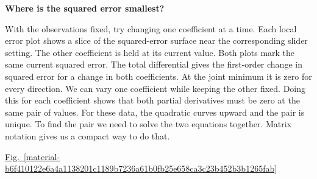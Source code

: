 \documentclass[11pt,a4paper]{article}
\begin{document}
\textbf{Where is the squared error smallest?}


With the observations fixed, try changing one coefficient at a time. Each local error plot shows a slice of the squared-error surface near the corresponding slider setting. The other coefficient is held at its current value. Both plots mark the same current squared error. The total differential gives the first-order change in squared error for a change in both coefficients. At the joint minimum it is zero for every direction. We can vary one coefficient while keeping the other fixed. Doing this for each coefficient shows that both partial derivatives must be zero at the same pair of values. For these data, the quadratic curves upward and the pair is unique. To find the pair we need to solve the two equations together. Matrix notation gives us a compact way to do that.


\hyperref[material-b6f410122e6a4a1138201c1189b7236a61b0fb25e658ca3c23b452b3b1265fab]{Fig.~\ref*{material-b6f410122e6a4a1138201c1189b7236a61b0fb25e658ca3c23b452b3b1265fab}}
\end{document}
